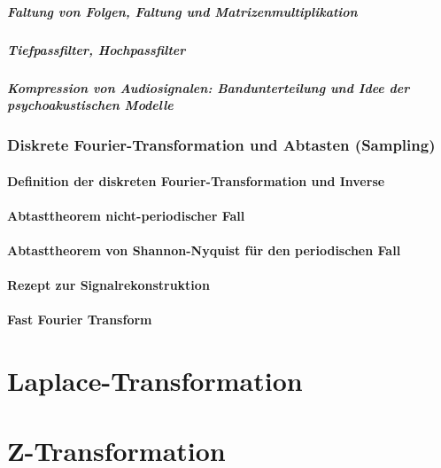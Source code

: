 \documentclass[a4paper]{article}
\begin{document}
\subsubsection{Faltung von Folgen, Faltung und Matrizenmultiplikation}
\subsubsection{Tiefpassfilter, Hochpassfilter}
\subsubsection{Kompression von Audiosignalen: Bandunterteilung und Idee der psychoakustischen Modelle}
\section{Diskrete Fourier-Transformation und Abtasten (Sampling)}
\subsection{Definition der diskreten Fourier-Transformation und Inverse}
\subsection{Abtasttheorem nicht-periodischer Fall}
\subsection{Abtasttheorem von Shannon-Nyquist für den periodischen Fall}
\subsection{Rezept zur Signalrekonstruktion}
\subsection{Fast Fourier Transform}
\part{Laplace-Transformation}
\part{Z-Transformation}

%



\newpage
\renewcommand{\indexname}{Stichwortverzeichnis} %
\printindex %
\end{document}
